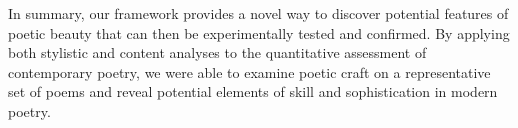 \documentclass{book}
\begin{document}
In summary, our framework provides a novel way to discover potential features of poetic beauty that can then be experimentally tested and confirmed. By applying both stylistic and content analyses to the quantitative assessment of contemporary poetry, we were able to examine poetic craft on a representative set of poems and reveal potential elements of skill and sophistication in modern poetry.

%
%
\end{document}
